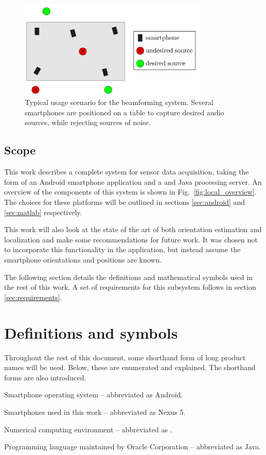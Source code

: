 \documentclass[a4paper, notitlepage]{report}
\begin{document}
\begin{figure}[hbt]
\centering
\includegraphics[width=0.8\textwidth]{figures/introduction/goal_example}
\caption[Typical usage scenario for the beamforming system.]{Typical usage scenario for the beamforming system. Several smartphones are positioned on a table to capture desired audio sources, while rejecting sources of noise.}
\label{fig:goal_example}
\end{figure}


\subsection{Scope}
This work describes a complete system for sensor data acquisition, taking the form of an Android smartphone application and a \matlab and Java processing server. An overview of the components of this system is shown in Fig.~\ref{fig:local_overview}. The choices for these platforms will be outlined in sections \ref{sec:android} and \ref{sec:matlab} respectively.

This work will also look at the state of the art of both orientation estimation and localization and make some recommendations for future work. It was chosen not to incorporate this functionality in the application, but instead assume the smartphone orientations and positions are known.

The following section details the definitions and mathematical symbols used in the rest of this work. A set of requirements for this subsystem follows in section \ref{sec:requirements}.

\section{Definitions and symbols}
Throughout the rest of this document, some shorthand form of long product names will be used. Below, these are enumerated and explained. The shorthand forms are also introduced.
\begin{description}[labelwidth=4cm]
\item[Android\texttrademark~platform]	Smartphone operating system -- abbreviated as Android. 
\item[Google Nexus 5\texttrademark]	Smartphones used in this work -- abbreviated as Nexus 5.
\item[MATLAB Student R2014b]		Numerical computing environment -- abbreviated as \matlab.
\item[Java\textregistered]		Programming language maintained by Oracle Corporation -- abbreviated as Java.
\end{description}
\end{document}

